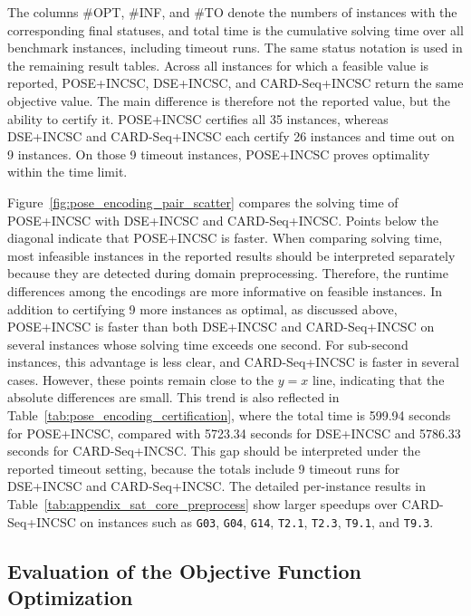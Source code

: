 \documentclass[letterpaper,journal]{IEEEtran}
\begin{document}
The columns \#OPT, \#INF, and \#TO denote the numbers of instances with the corresponding final statuses, and total time is the cumulative solving time over all benchmark instances, including timeout runs. The same status notation is used in the remaining result tables. Across all instances for which a feasible value is reported, POSE+INCSC, DSE+INCSC, and CARD-Seq+INCSC return the same objective value. 
The main difference is therefore not the reported value, but the ability to certify it. POSE+INCSC certifies all 35 instances, whereas DSE+INCSC and CARD-Seq+INCSC each certify 26 instances and time out on 9 instances. On those 9 timeout instances, POSE+INCSC proves optimality within the time limit.

Figure~\ref{fig:pose_encoding_pair_scatter} compares the solving time of POSE+INCSC with DSE+INCSC and CARD-Seq+INCSC. Points below the diagonal indicate that POSE+INCSC is faster. When comparing solving time, most infeasible instances in the reported results should be interpreted separately because they are detected during domain preprocessing. Therefore, the runtime differences among the encodings are more informative on feasible instances. In addition to certifying 9 more instances as optimal, as discussed above, POSE+INCSC is faster than both DSE+INCSC and CARD-Seq+INCSC on several instances whose solving time exceeds one second. For sub-second instances, this advantage is less clear, and CARD-Seq+INCSC is faster in several cases. However, these points remain close to the $y=x$ line, indicating that the absolute differences are small. 
This trend is also reflected in Table~\ref{tab:pose_encoding_certification}, where the total time is 599.94 seconds for POSE+INCSC, compared with 5723.34 seconds for DSE+INCSC and 5786.33 seconds for CARD-Seq+INCSC. This gap should be interpreted under the reported timeout setting, because the totals include 9 timeout runs for DSE+INCSC and CARD-Seq+INCSC. The detailed per-instance results in Table~\ref{tab:appendix_sat_core_preprocess} show larger speedups over CARD-Seq+INCSC on instances such as \texttt{G03}, \texttt{G04}, \texttt{G14}, \texttt{T2.1}, \texttt{T2.3}, \texttt{T9.1}, and \texttt{T9.3}.

\subsection{Evaluation of the Objective Function Optimization}
\end{document}
